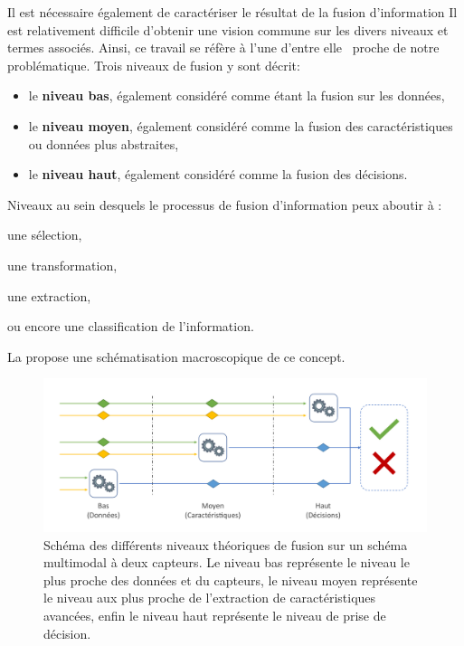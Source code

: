 Il est nécessaire également de caractériser le résultat de la fusion d'information
Il est relativement difficile d'obtenir une vision commune sur les divers niveaux et termes associés. Ainsi, ce travail se réfère à l'une d'entre elle~\cite{Dasarathy1997} proche de notre problématique. Trois niveaux de fusion y sont décrit:
\begin{itemize}
\item le \textbf{niveau bas}, également considéré comme étant la fusion sur les données,
\item le\textbf{ niveau moyen}, également considéré comme la fusion des caractéristiques ou données plus abstraites,
\item le \textbf{niveau haut}, également considéré comme la fusion des décisions.
\end{itemize} Niveaux au sein desquels le processus de fusion d'information peux aboutir à :
\begin{inlinerate}
\item une sélection,
\item une transformation,
\item une extraction,
\item ou encore une classification de l'information.
\end{inlinerate} La  propose une schématisation macroscopique de ce concept.\par
 
\begin{figure}[H]
    \centering
    \includegraphics[width=\linewidth]{contents/chapter_3/resources/scheme_overview_fusion.pdf}
    \caption{Schéma des différents niveaux théoriques de fusion sur un schéma multimodal à deux capteurs. Le niveau bas représente le niveau le plus proche des données et du capteurs, le niveau moyen représente le niveau aux plus proche de l'extraction de caractéristiques avancées, enfin le niveau haut représente le niveau de prise de décision.}
    \label{fig:scheme_overview_fusion}
\end{figure}\par

